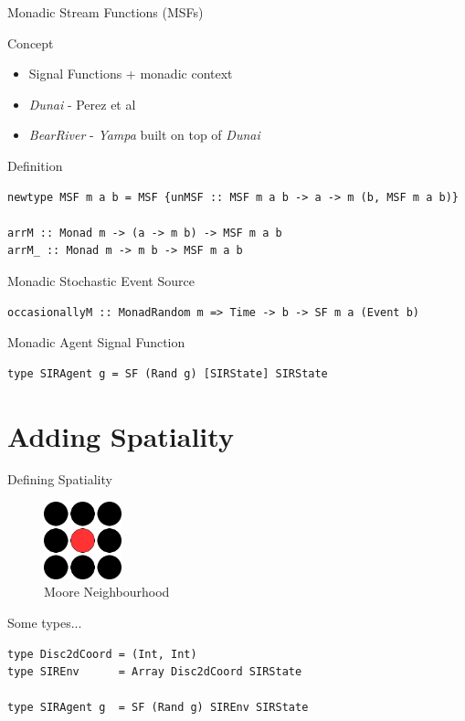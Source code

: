 \documentclass{beamer}
\begin{document}
\begin{frame}[fragile]{Monadic Stream Functions (MSFs)}
\begin{block}{Concept}
\begin{itemize}
  \item Signal Functions + monadic context 
  \item \textit{Dunai} - Perez et al 
  \item \textit{BearRiver} - \textit{Yampa} built on top of \textit{Dunai}
\end{itemize}
\end{block}

\begin{block}{Definition}
\begin{verbatim}
newtype MSF m a b = MSF {unMSF :: MSF m a b -> a -> m (b, MSF m a b)}

arrM :: Monad m -> (a -> m b) -> MSF m a b
arrM_ :: Monad m -> m b -> MSF m a b
\end{verbatim}
\end{block}
    
\begin{block}{Monadic Stochastic Event Source}
\begin{verbatim}
occasionallyM :: MonadRandom m => Time -> b -> SF m a (Event b)
\end{verbatim}
\end{block}

\begin{block}{Monadic Agent Signal Function}
\begin{verbatim}
type SIRAgent g = SF (Rand g) [SIRState] SIRState 
\end{verbatim}
\end{block}
\end{frame}

\section{Adding Spatiality}
\begin{frame}[fragile]{Defining Spatiality}
\begin{figure}
\begin{center}
\includegraphics[width=0.2\textwidth]{./fig/moore.png}
\caption*{Moore Neighbourhood}
\end{center}
\end{figure}

\begin{block}{Some types...}
\begin{verbatim}
type Disc2dCoord = (Int, Int)
type SIREnv      = Array Disc2dCoord SIRState

type SIRAgent g  = SF (Rand g) SIREnv SIRState
\end{verbatim}
\end{block}
\end{frame}
\end{document}
